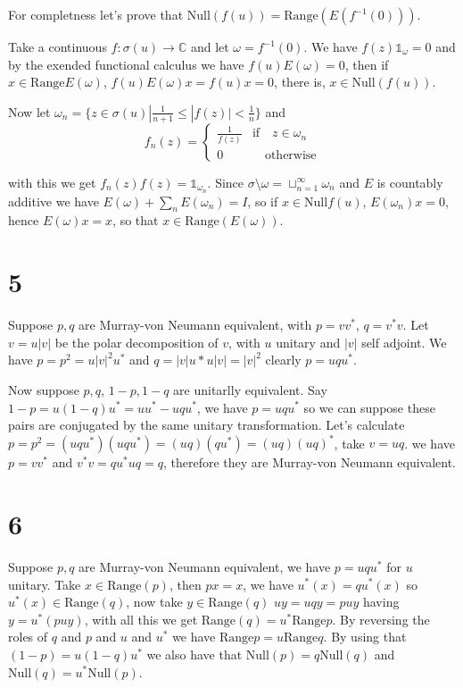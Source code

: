 \documentclass{article}
\begin{document}
For completness let's prove that Null$(f(u))=\text{Range}(E(f^{-1}(0)))$. 

Take a continuous $f:\sigma(u)\to \mathbb{C}$ and let $\omega=f^{-1}(0)$. 
We have $f(z)\mathds{1}_{\omega}=0$ and by the exended functional calculus we 
have $f(u)E(\omega)=0$, then if $x\in\text{Range}E(\omega)$, $f(u)E(\omega)x=
f(u)x=0$, there is, $x\in\text{Null}(f(u))$. 

Now let $\omega_n=\{z\in \sigma(u)|\frac{1}{n+1}\leq|f(z)|< \frac{1}{n}\}$
and \[f_n(z)=
\begin{cases}
    \frac{1}{f(z)} & \text{if}\quad z\in \omega_n \\
    0 & \quad \text{otherwise}
\end{cases}\]

with this we get $f_n(z)f(z)=\mathds{1}_{\omega_n}$. Since $\sigma\setminus
\omega=\sqcup_{n=1}^{\infty}\omega_n$ and $E$ is countably additive we have
$E(\omega)+\sum_n E(\omega_n)=I$, so if $x\in \text{Null}f(u)$, $E(\omega_n)x
=0$, hence $E(\omega)x=x$, so that $x\in \text{Range}(E(\omega))$.








\section*{5}

 \quad\quad   Suppose $p,q$ are Murray-von Neumann equivalent, with $p=vv^\ast$, $q=v^\ast v$. Let $v=u|v|$ be the polar
decomposition of $v$, with $u$ unitary and $|v|$ self adjoint. We have $p=p^2=u|v|^2u^\ast$ 
and $q=|v|u\ast u |v|=|v|^2$
clearly $p=uqu^\ast$.

Now suppose $p,q$, $1-p,1-q$ are unitarlly equivalent. Say $1-p=u(1-q)u^\ast=uu^\ast -uqu^\ast$, we have
$p=uqu^\ast$ so we can suppose these pairs are conjugated by the same unitary transformation. 
Let's calculate $p=p^2=(uqu^\ast)(uqu^\ast)=(uq)(qu^\ast)=(uq)(uq)^\ast $, take $v=uq$. we have $p=vv^\ast$
and $v^\ast v= qu^\ast u q=q$, therefore they are Murray-von Neumann equivalent.


\section*{6}

Suppose $p,q$ are Murray-von Neumann equivalent, we have $p=uqu^\ast$ for $u$ unitary. Take $x\in\text{Range}(p)$, then $px=x$,
we have $u^\ast(x)=qu^\ast(x)$ so $u^\ast(x)\in \text{Range}(q)$, now take $y\in \text{Range}(q)$ 
$uy=uqy=puy$ having $y=u^\ast(puy)$, with all this we get $\text{Range}(q)=u^\ast \text{Range}p$.
By reversing the roles of $q$ and $p$ and $u$ and $u^\ast$ we have $\text{Range}p=
u\text{Range}q$. By using that $(1-p)=u(1-q)u^\ast$ we also have that $\text{Null} (p)=q\text{Null}(q)$
and $\text{Null}(q)=u^\ast\text{Null}(p)$. 
\end{document}
